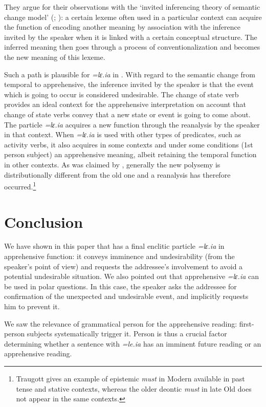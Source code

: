 \documentclass[output=paper,colorlinks,citecolor=brown, language=chinese]{langscibook}
\begin{document}
They argue for their observations with the `invited inferencing theory of semantic change model' (\cite[34--40]{TraugottDasher2002}; \cite[552--553]{Traugott2006}): a certain lexeme often used in a particular context can acquire the function of encoding another meaning by association with the inference invited by the speaker when it is linked with a certain conceptual structure. The inferred meaning then goes through a process of conventionalization and becomes the new meaning of this lexeme. 

Such a path is plausible for \textit{=lɛ.ia} in . With regard to the semantic change from temporal to apprehensive, the inference invited by the speaker is that the event which is going to occur is considered undesirable. The change of state verb provides an ideal context for the apprehensive interpretation on account that change of state verbs convey that a new state or event is going to come about. The particle \textit{=lɛ.ia} acquires a new function through the reanalysis by the speaker in that context. When \textit{=lɛ.ia} is used with other types of predicates, such as activity verbs, it also acquires in some contexts and under some conditions (1st person subject) an apprehensive meaning, albeit retaining the temporal function in other contexts. As was claimed by \citet[553]{Traugott2006}, generally the new polysemy is distributionally different from the old one and a reanalysis has therefore occurred.\footnote{Traugott gives an example of epistemic \textit{must} in Modern  available in past tense and stative contexts, whereas the older deontic \textit{must} in late Old  does not appear in the same contexts.}


\section{Conclusion}
\label{song-conclusion}

We have shown in this paper that  has a final enclitic particle \textit{=lɛ.ia} in apprehensive function: it conveys imminence and undesirability (from the speaker's point of view) and requests the addressee's involvement to avoid a potential undesirable situation. We also pointed out that apprehensive \textit{=lɛ.ia} can be used in polar questions. In this case, the speaker asks the addressee for confirmation of the unexpected and undesirable event, and implicitly requests him to prevent it.

We saw the relevance of grammatical person for the apprehensive reading:  first-person subjects systematically trigger it. Person is thus a crucial factor determining whether a sentence with \textit{=le.ia} has an imminent future reading or an apprehensive reading.
\end{document}
